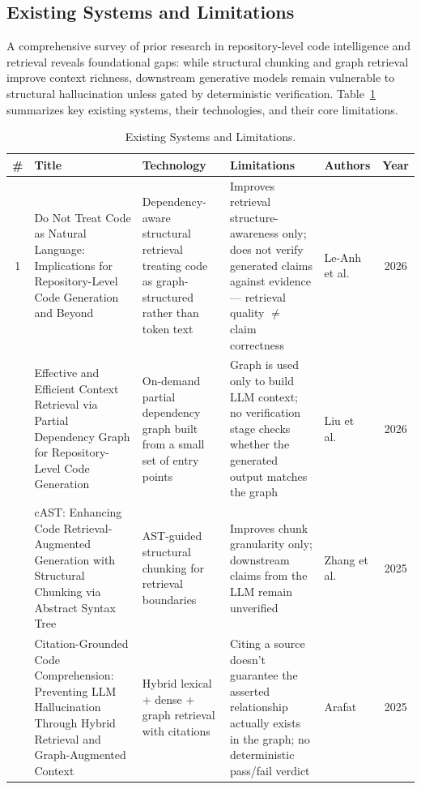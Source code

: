 \documentclass[runningheads]{llncs}
\begin{document}
\subsection{Existing Systems and Limitations}
A comprehensive survey of prior research in repository-level code intelligence and retrieval reveals foundational gaps: while structural chunking and graph retrieval improve context richness, downstream generative models remain vulnerable to structural hallucination unless gated by deterministic verification. Table~\ref{tab:existing_systems} summarizes key existing systems, their technologies, and their core limitations.

\begin{table}[t]
\centering
\small
\caption{Existing Systems and Limitations.}
\label{tab:existing_systems}
\begin{tabular}{cp{4.5cm}p{3.5cm}p{4cm}p{2.5cm}c}
\toprule
\textbf{\#} & \textbf{Title} & \textbf{Technology} & \textbf{Limitations} & \textbf{Authors} & \textbf{Year} \\
\midrule
1 & Do Not Treat Code as Natural Language: Implications for Repository-Level Code Generation and Beyond & Dependency-aware structural retrieval treating code as graph-structured rather than token text & Improves retrieval structure-awareness only; does not verify generated claims against evidence --- retrieval quality $\neq$ claim correctness & Le-Anh et al.~\cite{leanh2026code} & 2026 \\
\addlinespace
2 & Effective and Efficient Context Retrieval via Partial Dependency Graph for Repository-Level Code Generation & On-demand partial dependency graph built from a small set of entry points & Graph is used only to build LLM context; no verification stage checks whether the generated output matches the graph & Liu et al.~\cite{liu2026partial} & 2026 \\
\addlinespace
3 & cAST: Enhancing Code Retrieval-Augmented Generation with Structural Chunking via Abstract Syntax Tree & AST-guided structural chunking for retrieval boundaries & Improves chunk granularity only; downstream claims from the LLM remain unverified & Zhang et al.~\cite{zhang2025cast} & 2025 \\
\addlinespace
4 & Citation-Grounded Code Comprehension: Preventing LLM Hallucination Through Hybrid Retrieval and Graph-Augmented Context & Hybrid lexical + dense + graph retrieval with citations & Citing a source doesn't guarantee the asserted relationship actually exists in the graph; no deterministic pass/fail verdict & Arafat~\cite{arafat2025citation} & 2025 \\

\end{tabular}
\end{table}
\end{document}
